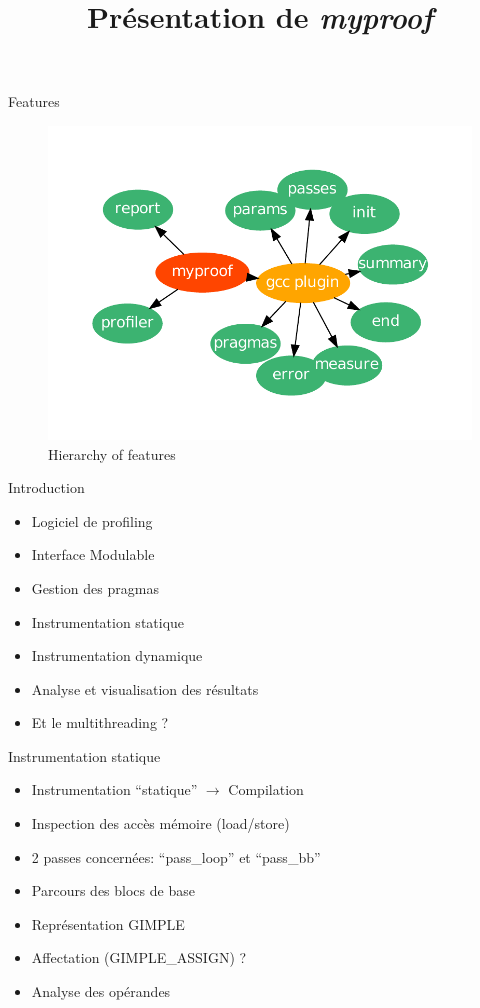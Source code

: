 \documentclass{beamer}
\title[Outil de profiling \emph{myproof}]{Présentation de \emph{myproof}}
\begin{document}
\begin{frame}
  \titlepage
\end{frame}

\begin{frame}{Features}
\begin{figure}[here]
  \centering
  \includegraphics[scale=0.7]{images/schema.pdf}
  \caption{Hierarchy of features}
\end{figure}
\end{frame}

\begin{frame}{Introduction}
  \begin{itemize}
  \item Logiciel de profiling
  \item Interface Modulable
  \item Gestion des pragmas
  \item Instrumentation statique
  \item Instrumentation dynamique
  \item Analyse et visualisation des résultats
  \item Et le multithreading ?
  \end{itemize}
\end{frame}

\begin{frame}{Instrumentation statique}
  \begin{itemize}
  \item Instrumentation ``statique'' $\rightarrow$ Compilation
  \item Inspection des accès mémoire (load/store)
  \item 2 passes concernées: ``pass\_loop'' et ``pass\_bb''
  \item Parcours des blocs de base
  \item Représentation GIMPLE
  \item Affectation (GIMPLE\_ASSIGN) ?
  \item Analyse des opérandes
  \end{itemize}
\end{frame}
\end{document}
